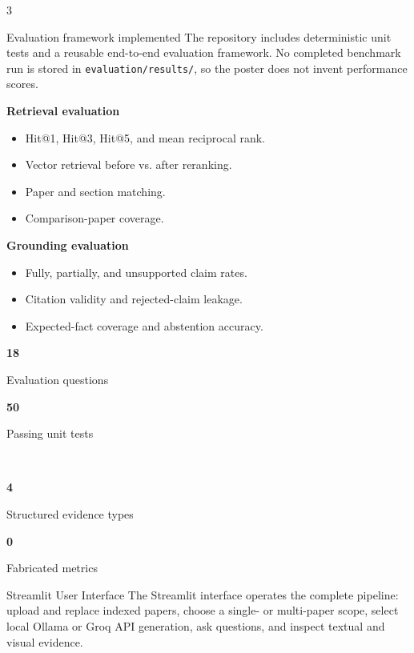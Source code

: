 \documentclass[a0,portrait]{a0poster}
\newcommand{\metric}[2]{%
  \begin{minipage}[c]{0.47\linewidth}\centering
  {\color{PosterBlue}\bfseries\LARGE #1}\par
  {\large #2}
  \end{minipage}}
\begin{document}
\begin{multicols}{3}
\columnbreak

\begin{posterbox}{Evaluation framework implemented}
The repository includes deterministic unit tests and a reusable end-to-end
evaluation framework. No completed benchmark run is stored in
\texttt{evaluation/results/}, so the poster does not invent performance scores.

\textbf{Retrieval evaluation}
\begin{itemize}
  \item Hit@1, Hit@3, Hit@5, and mean reciprocal rank.
  \item Vector retrieval before vs. after reranking.
  \item Paper and section matching.
  \item Comparison-paper coverage.
\end{itemize}

\textbf{Grounding evaluation}
\begin{itemize}
  \item Fully, partially, and unsupported claim rates.
  \item Citation validity and rejected-claim leakage.
  \item Expected-fact coverage and abstention accuracy.
\end{itemize}

\begin{center}
\metric{18}{Evaluation questions}\hfill
\metric{50}{Passing unit tests}\\[5mm]
\metric{4}{Structured evidence types}\hfill
\metric{0}{Fabricated metrics}
\end{center}
\end{posterbox}

\begin{posterbox}{Streamlit User Interface}
The Streamlit interface operates the complete pipeline: upload and replace
indexed papers, choose a single- or multi-paper scope, select local Ollama or
Groq API generation, ask questions, and inspect textual and visual evidence.


\end{posterbox}
\end{multicols}
\end{document}
